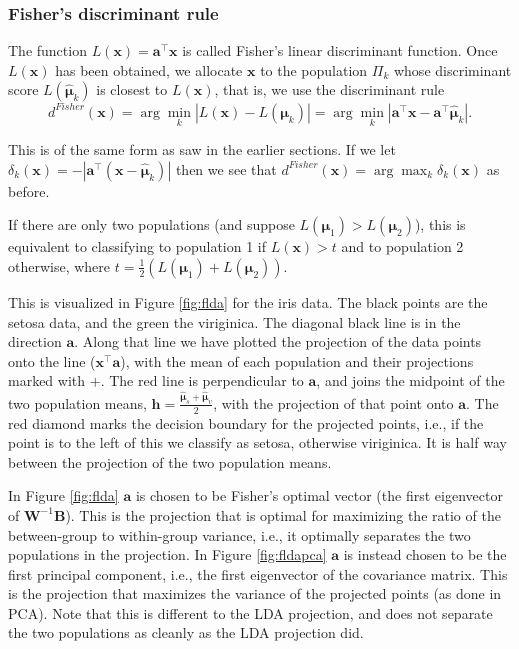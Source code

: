 \documentclass[
]{book}
\theoremstyle{definition}
\theoremstyle{definition}
\theoremstyle{definition}
\theoremstyle{definition}
\theoremstyle{remark}
\begin{document}
\subsubsection*{Fisher's discriminant rule}\label{fishers-discriminant-rule}

The function \(L(\mathbf x)=\mathbf a^\top \mathbf x\) is called Fisher's linear discriminant function. Once \(L(\mathbf x)\) has been obtained, we allocate \(\mathbf x\) to the population \(\Pi_k\) whose discriminant score \(L(\hat{{\boldsymbol{\mu}}}_k)\) is closest to \(L(\mathbf x)\), that is, we use the discriminant rule \[ d^{Fisher}(\mathbf x) = \arg \min_k |L(\mathbf x) - L({\boldsymbol{\mu}}_k)| = \arg \min_k | \mathbf a^\top \mathbf x- \mathbf a^\top \hat{{\boldsymbol{\mu}}}_k |. \]

This is of the same form as saw in the earlier sections. If we let \(\delta_k(\mathbf x)= -|\mathbf a^\top (\mathbf x-\hat{{\boldsymbol{\mu}}}_k)|\) then we see that
\(d^{Fisher}(\mathbf x) = \arg \max_k \delta_k(\mathbf x)\) as before.

If there are only two populations (and suppose \(L({\boldsymbol{\mu}}_1)> L({\boldsymbol{\mu}}_2)\)), this is equivalent to classifying to population 1 if \(L(\mathbf x)>t\) and to population 2 otherwise, where \(t = \frac{1}{2}(L({\boldsymbol{\mu}}_1)+L({\boldsymbol{\mu}}_2))\).

This is visualized in Figure \ref{fig:flda} for the iris data. The black points are the setosa data, and the green the viriginica. The diagonal black line is in the direction \(\mathbf a\). Along that line we have plotted the projection of the data points onto the line (\(\mathbf x^\top \mathbf a\)), with the mean of each population and their projections marked with \(+\). The red line is perpendicular to \(\mathbf a\), and joins the midpoint of the two population means, \(\mathbf h= \frac{\hat{{\boldsymbol{\mu}}}_s+\hat{{\boldsymbol{\mu}}}_v}{2}\), with the projection of that point onto \(\mathbf a\). The red diamond marks the decision boundary for the projected points, i.e., if the point is to the left of this we classify as setosa, otherwise viriginica. It is half way between the projection of the two population means.

In Figure \ref{fig:flda} \(\mathbf a\) is chosen to be Fisher's optimal vector (the first eigenvector of \(\mathbf W^{-1}\mathbf B\)). This is the projection that is optimal for maximizing the ratio of the between-group to within-group variance, i.e., it optimally separates the two populations in the projection. In Figure \ref{fig:fldapca} \(\mathbf a\) is instead chosen to be the first principal component, i.e., the first eigenvector of the covariance matrix. This is the projection that maximizes the variance of the projected points (as done in PCA). Note that this is different to the LDA projection, and does not separate the two populations as cleanly as the LDA projection did.
\end{document}
